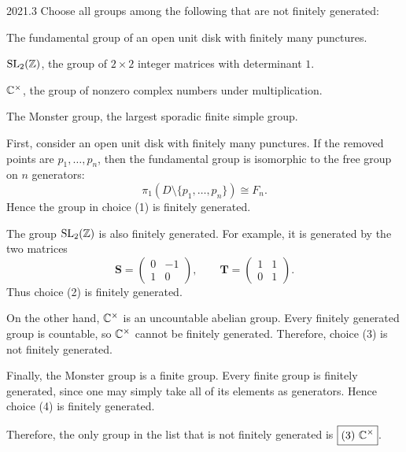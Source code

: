     \begin{pastproblem}{2021.3}
        Choose all groups among the following that are not finitely generated:
        \begin{problemchoices}
            \item The fundamental group of an open unit disk with finitely many punctures.
            \item \(\operatorname{SL}_2(\mathbb{Z})\), the group of \(2\times 2\) integer matrices with determinant \(1\).
            \item \(\mathbb{C}^{\times}\), the group of nonzero complex numbers under multiplication.
            \item The Monster group, the largest sporadic finite simple group.
        \end{problemchoices}
    \end{pastproblem}

    \begin{solution}
        First, consider an open unit disk with finitely many punctures. If the removed points are
        $p_1,\dots,p_n$, then the fundamental group is isomorphic to the free group on $n$
        generators:
        \[
            \pi_1\left(D\setminus\{p_1,\dots,p_n\}\right)\cong F_n.
        \]
        Hence the group in choice (1) is finitely generated.

        The group $\operatorname{SL}_2(\mathbb{Z})$ is also finitely generated. For example, it is generated by the two
        matrices
        \[
            \mathbf{S}=
            \begin{pmatrix}
                0 & -1 \\
                1 & 0
            \end{pmatrix},
            \qquad
            \mathbf{T}=
            \begin{pmatrix}
                1 & 1 \\
                0 & 1
            \end{pmatrix}.
        \]
        Thus choice (2) is finitely generated.

        On the other hand, $\mathbb{C}^{\times}$ is an uncountable abelian group. Every finitely generated
        group is countable, so $\mathbb{C}^{\times}$ cannot be finitely generated. Therefore, choice (3) is
        not finitely generated.

        Finally, the Monster group is a finite group. Every finite group is finitely generated,
        since one may simply take all of its elements as generators. Hence choice (4) is finitely
        generated.

        Therefore, the only group in the list that is not finitely generated is $\boxed{(3)\
        \mathbb{C}^{\times}}$.
    \end{solution}

